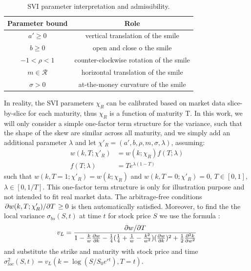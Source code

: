 \documentclass[%
 reprint,
 superscriptaddress,
nobibnotes,
 amsmath,amssymb,
 aps,
]{revtex4-2}
\begin{document}
\begin{table}[!ht]
  \centering
  \begin{tabular}{|@{}c| c@{}|}
    \hline
    Parameter bound & Role \\ 
    \hline
    $a'\geq 0$      & vertical translation of the smile \\
    $b\geq0$        & open and close o the smile \\
    $-1<\rho<1$     & counter-clockwise rotation of the smile\\
    $m\in \mathcal{R}$        & horizontal translation of the smile \\
    $\sigma>0$   & at-the-money curvature of the smile \\
    \hline
  \end{tabular}
  \caption{SVI parameter interpretation and admissibility.}
  \label{tab:svi-params}
\end{table}
In reality, the SVI parameters $\chi_R$ can be calibrated based on market data slice-by-slice for each maturity, thus $\chi_R$ is a function of maturity T. In this work, we will only consider a simple one-factor term structure for the variance, such that the shape of the skew are similar across all maturity, and we simply add an additional parameter $\lambda$ and let $\chi'_R = (a',b,\rho,m,\sigma,\lambda)$, assuming:
\begin{equation}
\begin{aligned}
    w(k, T; \chi'_R) &= w(k; \chi_R)f(T; \lambda) \\
    f(T; \lambda) &= T e^{\lambda (1-T)}
\end{aligned}
\end{equation}
such that $w(k, T=1; \chi'_R) = w(k; \chi_R)$ and $w(k, T=0; \chi'_R)=0$, $T\in[0,1]$, $\lambda\in[0,1/T]$. This one-factor term structure is only for illustration purpose and not intended to fit real market data. The arbitrage-free conditions $\pdv*{w(k, T; \chi'_R)}{T} \geq 0$ is then automatically satisfied. Moreover, to find the the local variance $\sigma_{bs}(S, t)$ at time $t$ for stock price $S$ we use the formula \cite{dupire1994pricing, gatheral2011volatility}:
\begin{equation}
    v_L = \frac{\pdv*{w}{T}}{1-\frac{k}{w}\pdv{w}{k}-\frac{1}{4}(\frac{1}{4}+\frac{1}{w}-\frac{k^2}{w^2})(\pdv{w}{k})^2+\frac{1}{2}\pdv[2]{k}{w}}
\end{equation}
and substitute the strike and maturity with stock price and time $\sigma_{loc}^2(S,t) = v_L(k=\log(S/S_0e^{rt}),T=t)$.
\end{document}
